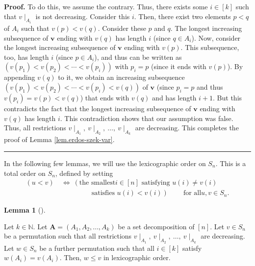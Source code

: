 \documentclass[numbers=enddot,12pt,final,onecolumn,notitlepage]{scrartcl}%
\numberwithin{exer}{subsection}
\theoremstyle{definition}
\newtheorem{lem}[theo]{Lemma}
\newenvironment{lemma}[1][]
{\begin{lem}[#1]\begin{leftbar}}
{\end{leftbar}\end{lem}}
\newenvironment{proof}[1][Proof]{\noindent\textbf{#1.} }{\ \rule{0.5em}{0.5em}}
\begin{document}
\begin{proof}
To do this, we assume the contrary. Thus, there exists some $i\in\left[
k\right]  $ such that $v\mid_{A_{i}}$ is not decreasing. Consider this $i$.
Then, there exist two elements $p<q$ of $A_{i}$ such that $v\left(  p\right)
<v\left(  q\right)  $. Consider these $p$ and $q$. The longest increasing
subsequence of $\mathbf{v}$ ending with $v\left(  q\right)  $ has length $i$
(since $q\in A_{i}$). Now, consider the longest increasing subsequence of
$\mathbf{v}$ ending with $v\left(  p\right)  $. This subsequence, too, has
length $i$ (since $p\in A_{i}$), and thus can be written as $\left(  v\left(
p_{1}\right)  <v\left(  p_{2}\right)  <\cdots<v\left(  p_{i}\right)  \right)
$ with $p_{i}=p$ (since it ends with $v\left(  p\right)  $). By appending
$v\left(  q\right)  $ to it, we obtain an increasing subsequence $\left(
v\left(  p_{1}\right)  <v\left(  p_{2}\right)  <\cdots<v\left(  p_{i}\right)
<v\left(  q\right)  \right)  $ of $\mathbf{v}$ (since $p_{i}=p$ and thus
$v\left(  p_{i}\right)  =v\left(  p\right)  <v\left(  q\right)  $) that ends
with $v\left(  q\right)  $ and has length $i+1$. But this contradicts the fact
that the longest increasing subsequence of $\mathbf{v}$ ending with $v\left(
q\right)  $ has length $i$. This contradiction shows that our assumption was
false. Thus, all restrictions $v\mid_{A_{1}},\ v\mid_{A_{2}},\ \ldots
,\ v\mid_{A_{k}}$ are decreasing. This completes the proof of Lemma
\ref{lem.erdos-szek-var}.
\end{proof}

In the following few lemmas, we will use the lexicographic order on $S_{n}$.
This is a total order on $S_{n}$, defined by setting%
\begin{align*}
\left(  u<v\right)  \  &  \Longleftrightarrow\ \left(  \text{the smallest
}i\in\left[  n\right]  \text{ satisfying }u\left(  i\right)  \neq v\left(
i\right)  \right. \\
&  \ \ \ \ \ \ \ \ \ \ \ \ \ \ \ \ \ \ \ \ \left.  \text{satisfies }u\left(
i\right)  <v\left(  i\right)  \right)  \ \ \ \ \ \ \ \ \ \ \text{for all
}u,v\in S_{n}.
\end{align*}


\begin{lemma}
\label{lem.lex-less-1}Let $k\in\mathbb{N}$. Let $\mathbf{A}=\left(
A_{1},A_{2},\ldots,A_{k}\right)  $ be a set decomposition of $\left[
n\right]  $. Let $v\in S_{n}$ be a permutation such that all restrictions
$v\mid_{A_{1}},\ v\mid_{A_{2}},\ \ldots,\ v\mid_{A_{k}}$ are decreasing. Let
$w\in S_{n}$ be a further permutation such that all $i\in\left[  k\right]  $
satisfy $w\left(  A_{i}\right)  =v\left(  A_{i}\right)  $. Then, $w\leq v$ in
lexicographic order.
\end{lemma}
\end{document}
